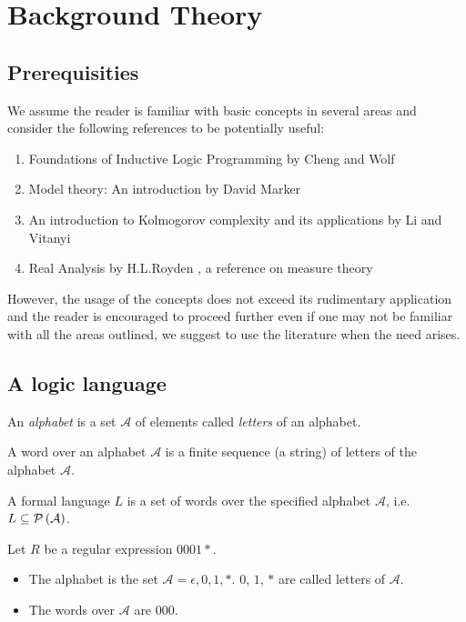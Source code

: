 
\chapter{Background Theory}

\section{Prerequisities}
We assume the reader is familiar with basic concepts in several areas and consider the following references to be potentially useful:
\begin{enumerate}
\item Foundations of Inductive Logic Programming by Cheng and Wolf \cite{cheng1997}
\item Model theory: An introduction by David Marker \cite{marker2002}
\item An introduction to Kolmogorov complexity and its applications by Li and Vitanyi \cite{li1997}
\item Real Analysis by H.L.Royden  \cite{royden1988}, a reference on measure theory
\end{enumerate}
However, the usage of the concepts does not exceed its rudimentary application and the reader is encouraged to proceed further even if one may not be familiar with all the areas outlined, we suggest to use the literature when the need arises.
\section{A logic language}
\begin{defn}
An \emph{alphabet} is a set $\mathcal{A}$ of elements called \emph{letters} of an alphabet.
\end{defn}

\begin{defn}
A word over an alphabet $\mathcal{A}$ is a finite sequence (a string) of letters of the alphabet $\mathcal{A}$.
\end{defn}

\begin{defn}
A formal language $L$ is a set of words over the specified alphabet $\mathcal{A}$, i.e. $L \subseteq \mathcal{P} \left({ \mathcal{A} }\right)$.
\end{defn}

\begin{exmp}
Let $R$ be a regular expression $0001*$.
\begin{itemize}
\item The alphabet is the set $\mathcal{A}={\epsilon, 0,1,*}$. $0$, $1$, $*$ are called letters of $\mathcal{A}$.
\item The words over $\mathcal{A}$ are $000$.
\end{itemize}
\end{exmp}

